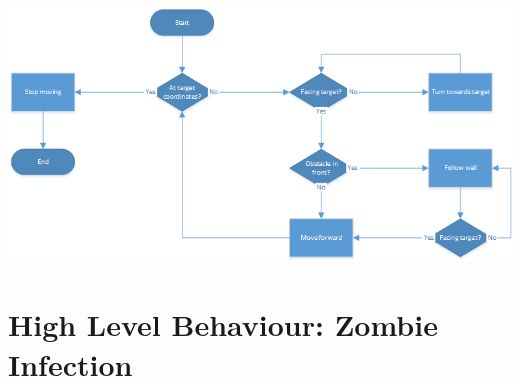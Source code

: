 \documentclass[11pt]{article}
\begin{document}
\pagebreak

\includegraphics[width=1.5\textwidth, angle=-90]{ObstacleAvoidance.png}

\section*{High Level Behaviour: Zombie Infection}
\end{document}
